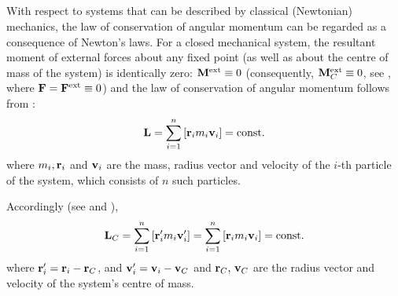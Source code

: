 \subsection{}\label{4.4.2} With respect to systems that can be described by classical (Newtonian) mechanics, the law of conservation of angular momentum can be regarded as a consequence of Newton's laws. For a closed mechanical system, the resultant moment of exter­nal forces about any fixed point (as well as about the centre of mass of the system) is identically zero: $\vb{M}^{\textrm{ext}} \equiv 0$ (consequently, $\vb{M}^{\textrm{ext}}_{C} \equiv 0$, see , where $\vb{F} = \vb{F}^{\textrm{ext}} \equiv 0$) and the law of conservation of angular momentum follows from :
\begin{equation*}%
\vb{L} = \sum_{i=1}^{n} \qty[\vb{r}_{i} m_{i} \vb{v}_{i}] = \textrm{const}.
\end{equation*}
where $m_{i},\vb{r}_{i}$ and $\vb{v}_{i}$ are the mass, radius vector and velocity of the $i$-th particle of the system, which consists of $n$ such particles. 

Accordingly (see  and ),
\begin{equation*}%
\vb{L}_{C} = \sum_{i=1}^{n} \qty[\vb{r}_{i}' m_{i} \vb{v}_{i}'] = \sum_{i=1}^{n} \qty[\vb{r}_{i} m_{i} \vb{v}_{i}] =\textrm{const}.
\end{equation*}
where $\vb{r}_{i}' = \vb{r}_{i} - \vb{r}_{C}$, and $\vb{v}_{i}' = \vb{v}_{i} - \vb{v}_{C}$ and $\vb{r}_{C},\,\vb{v}_{C}$ are the radius vector and velocity of the system's centre of mass.

